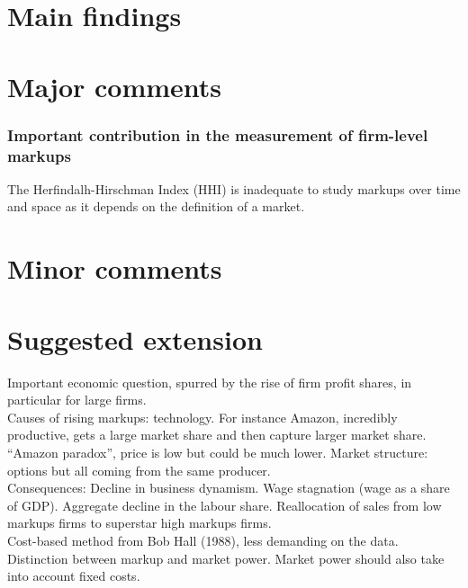\documentclass{amsart}
\theoremstyle{definition}
\theoremstyle{remark}
\numberwithin{equation}{section}
\begin{document}
\section{Main findings}



\section{Major comments}

\subsubsection{Important contribution in the measurement of firm-level markups} The Herfindalh-Hirschman Index (HHI) is inadequate to study markups over time and space as it depends on the definition of a market. \cite{de2019rise}

\subsubsection{}

\section{Minor comments}

\section{Suggested extension}

Important economic question, spurred by the rise of firm profit shares, in particular for large firms.\\

Causes of rising markups: technology. For instance Amazon, incredibly productive, gets a large market share and then capture larger market share. ``Amazon paradox'', price is low but could be much lower. Market structure: options but all coming from the same producer.\\

Consequences: Decline in business dynamism. Wage stagnation (wage as a share of GDP). Aggregate decline in the labour share. Reallocation of sales from low markups firms to superstar high markups firms.\\

Cost-based method from Bob Hall (1988), less demanding on the data. \\

Distinction between markup and market power. Market power should also take into account fixed costs.\\
\end{document}
